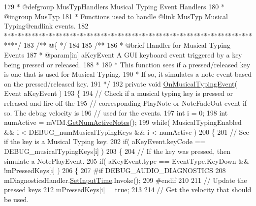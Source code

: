 \begin{DoxyCodeInclude}
179 \textcolor{comment}{    * @defgroup MusTypHandlers Musical Typing Event Handlers}
180 \textcolor{comment}{    * @ingroup MusTyp}
181 \textcolor{comment}{    * Functions used to handle @link MusTyp Musical Typing@endlink events.}
182 \textcolor{comment}{    ****************************************************************************/}\textcolor{comment}{}
183 \textcolor{comment}{    /** @\{ */}
184 \textcolor{comment}{}
185 \textcolor{comment}{    /**}
186 \textcolor{comment}{     * @brief Handler for Musical Typing Events }
187 \textcolor{comment}{     * @param[in] aKeyEvent A GUI keyboard event triggered by a key being pressed or released.}
188 \textcolor{comment}{     * }
189 \textcolor{comment}{     * This function sees if a pressed/released key is one that is used for Musical Typing. }
190 \textcolor{comment}{     * If so, it simulates a note event based on the pressed/released key.}
191 \textcolor{comment}{    */}
192     \textcolor{keyword}{private} \textcolor{keywordtype}{void} \hyperlink{group___mus_typ_handlers_ga391a3d207136b7eb0e734e289b520188}{OnMusicalTypingEvent}( Event aKeyEvent )
193     \{
194         \textcolor{comment}{// Check if a musical typing key is pressed or released and fire off the }
195         \textcolor{comment}{// corresponding PlayNote or NoteFadeOut event if so. The debug velocity is }
196         \textcolor{comment}{// used for the events.}
197         \textcolor{keywordtype}{int} i = 0;
198         \textcolor{keywordtype}{int} numActive = mVIM.\hyperlink{group___v_i_m_pub_func_ga3d6c823b1c1083eac8202f6c89e60b48}{GetNumActiveNotes}();
199         \textcolor{keywordflow}{while}( MusicalTypingEnabled && i < DEBUG\_numMusicalTypingKeys && i < numActive )
200         \{
201             \textcolor{comment}{// See if the key is a Musical Typing key.}
202             \textcolor{keywordflow}{if}( aKeyEvent.keyCode == DEBUG\_musicalTypingKeys[i] )
203             \{
204                 \textcolor{comment}{// If the key was pressed, then simulate a NotePlayEvent.}
205                 \textcolor{keywordflow}{if}( aKeyEvent.type == EventType.KeyDown && !mPressedKeys[i] )
206                 \{
207 \textcolor{preprocessor}{                    #if DEBUG\_AUDIO\_DIAGNOSTICS}
208                         mDiagnosticsHandler.\hyperlink{group___audio_testing_a133561901c2aef535b2f3c098e55b959}{SetInputTime}.Invoke();
209 \textcolor{preprocessor}{                    #endif}
210 
211                     \textcolor{comment}{// Update the pressed keys}
212                     mPressedKeys[i] = \textcolor{keyword}{true};
213 
214                     \textcolor{comment}{// Get the velocity that should be used.}

\end{DoxyCodeInclude}

